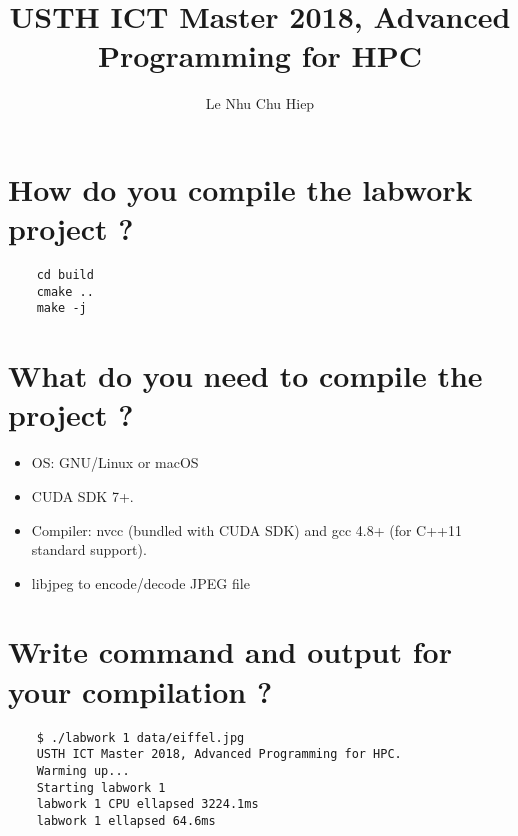 \documentclass{article}
\title{USTH ICT Master 2018, Advanced Programming for HPC}
\author{Le Nhu Chu Hiep}
\date{}
\begin{document}
\section{How do you compile the labwork project ?}
 \begin{verbatim}
	cd build
	cmake ..
	make -j
 \end{verbatim}
\section{What do you need to compile the project ?}
 \begin{itemize}
	\item OS: GNU/Linux or macOS
	\item CUDA SDK 7+.
	\item Compiler: nvcc (bundled with CUDA SDK) and gcc 4.8+ (for C++11 standard support).									                 \item libjpeg to encode/decode JPEG file
 \end{itemize}
\section{Write command and output for your compilation ?}
 \begin{verbatim}
 	$ ./labwork 1 data/eiffel.jpg 
	USTH ICT Master 2018, Advanced Programming for HPC.
	Warming up...
	Starting labwork 1
	labwork 1 CPU ellapsed 3224.1ms
	labwork 1 ellapsed 64.6ms
 \end{verbatim}
\end{document}
